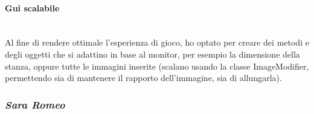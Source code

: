 \documentclass[a4paper,titlepage,12pt]{article}
\begin{document}
\paragraph{Gui scalabile}
\par \noindent \\
Al fine di rendere ottimale l’esperienza di gioco, ho optato per creare dei metodi e degli oggetti che si adattino in base al monitor, per esempio la dimensione della stanza, oppure tutte le immagini inserite (scalano usando la classe ImageModifier, permettendo sia di mantenere il rapporto dell’immagine, sia di allungarla).

\subsubsection*{\large \slshape Sara Romeo}
\end{document}
